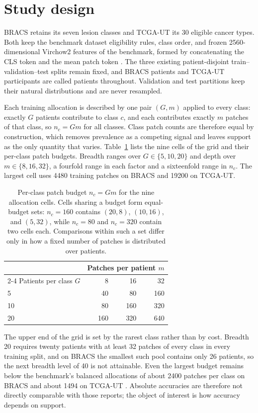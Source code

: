 \documentclass[11pt]{article}
\begin{document}
\section{Study design}
\label{sec:design}
BRACS retains its seven lesion classes and TCGA-UT its 30 eligible cancer types. Both keep the benchmark dataset eligibility rules, class order, and frozen 2560-dimensional Virchow2 features of the benchmark, formed by concatenating the CLS token and the mean patch token \citep{zimmermann2024virchow2,queisler2026benchmarkProtocol}. The three existing patient-disjoint train--validation--test splits remain fixed, and BRACS patients and TCGA-UT participants are called patients throughout. Validation and test partitions keep their natural distributions and are never resampled.

Each training allocation is described by one pair $(G,m)$ applied to every class: exactly $G$ patients contribute to class $c$, and each contributes exactly $m$ patches of that class, so $n_c=Gm$ for all classes. Class patch counts are therefore equal by construction, which removes prevalence as a competing signal and leaves support as the only quantity that varies. Table~\ref{tab:grid} lists the nine cells of the grid and their per-class patch budgets. Breadth ranges over $G\in\{5,10,20\}$ and depth over $m\in\{8,16,32\}$, a fourfold range in each factor and a sixteenfold range in $n_c$. The largest cell uses \num{4480} training patches on BRACS and \num{19200} on TCGA-UT.

\begin{table}[htbp]
\centering
\begin{tabular}{@{}lrrr@{}}
\toprule
& \multicolumn{3}{c}{Patches per patient $m$} \\
\cmidrule(l){2-4}
Patients per class $G$ & 8 & 16 & 32 \\
\midrule
5 & 40 & 80 & 160 \\
10 & 80 & 160 & 320 \\
20 & 160 & 320 & 640 \\
\bottomrule
\end{tabular}
\caption{Per-class patch budget $n_c=Gm$ for the nine allocation cells. Cells sharing a budget form equal-budget sets: $n_c=160$ contains $(20,8)$, $(10,16)$, and $(5,32)$, while $n_c=80$ and $n_c=320$ contain two cells each. Comparisons within such a set differ only in how a fixed number of patches is distributed over patients.}
\label{tab:grid}
\end{table}

\noindent The upper end of the grid is set by the rarest class rather than by cost. Breadth 20 requires twenty patients with at least 32 patches of every class in every training split, and on BRACS the smallest such pool contains only 26 patients, so the next breadth level of 40 is not attainable. Even the largest budget remains below the benchmark's balanced allocations of about \num{2400} patches per class on BRACS and about \num{1494} on TCGA-UT \citep{queisler2026benchmarkResults}. Absolute accuracies are therefore not directly comparable with those reports; the object of interest is how accuracy depends on support.
\end{document}
